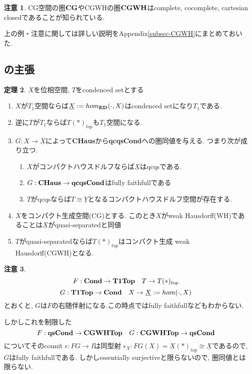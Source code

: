 \documentclass[dvipdfmx,a4paper,11pt]{report}
\theoremstyle{definition}
\newtheorem{thm}{定理}
\newtheorem{rem}[thm]{注意}
\begin{document}
\begin{rem}
CG空間の圏${\bf CG}$やCGWHの圏${\bf CGWH}$はcomplete, cocomplete, cartesian closedであることが知られている. 
\end{rem}

上の例・注意に関しては詳しい説明をAppendix\ref{subsec-CGWH}にまとめておいた. 

\subsection{\cite[Proposition 2.15, Theorem 2.16]{Sch19}の主張}

 \begin{tcolorbox}
 [colback = white, colframe = green!35!black, fonttitle = \bfseries,breakable = true]
\begin{thm}\cite[Proposition 2.15, Theorem 2.16]{Sch19}
\label{thm-Scholze-21516}
$X$を位相空間, $T$をcondenced setとする
\begin{enumerate}
\item $X$が$T_1$空間ならば$\underline{X}:=hom_{{\bf ED}}(\cdot, X)$はcondenced setになり$T_1$である. 
\item 逆に$T$が$T_1$ならば$T(\ast)_{top}$も$T_1$空間になる. 
\item $G : X \to \underline{X}$によって{\bf CHaus}から{\bf qcqsCond}への圏同値を与える. 
つまり次が成り立つ.
\begin{enumerate}
\item $X$がコンパクトハウスドルフならば$\underline{X}$はqcqsである.
\item $G : {\bf CHaus} \to {\bf qcqsCond}$はfully faithfullである
\item $T$がqcqsならば$T \cong \underline{Y}$となるコンパクトハウスドルフ空間が存在する. 
\end{enumerate}
\item $X$をコンパクト生成空間(CG)とする. このとき$X$がweak Hausdorff(WH)であることは$\underline{X}$がquasi-separatedと同値
\item $T$がquasi-separatedならば$T(\ast)_{top}$はコンパクト生成 weak Hausdorff(CGWH)となる.
\end{enumerate}
\end{thm}
 \end{tcolorbox}
 
 \begin{rem}
 $$F: 
 {\bf Cond }\to 
 {\bf T1Top}
 \quad 
 T \to T(\ast)_{top}$$
$$G :  {\bf T1Top} \to {\bf Cond} \quad X \to \underline{X}:=hom(\cdot, X)$$
とおくと, $G$は$F$の右随伴射になる.この時点ではfully faithfullなどもわからない.

しかしこれを制限した
$$
F: {\bf qsCond}
\to {\bf CGWHTop} 
\quad G :  
{\bf CGWHTop} \to{\bf qsCond}
$$
についてそのcounit $\epsilon : FG \to I$は同型射
$\epsilon_{X} : FG(X) = \underline{X}(\ast)_{top} \cong \underline{X}$であるので, $G$はfully faithfullである. しかしessentially surjectiveと限らないので, 圏同値とは限らない.
 \end{rem}
\end{document}
